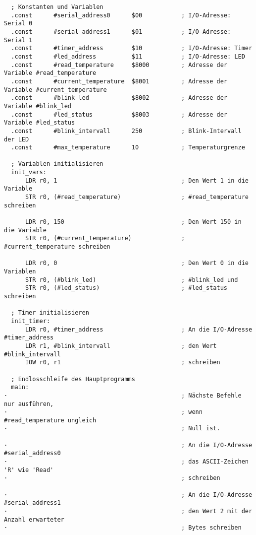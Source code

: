 {
\footnotesize

\begin{verbatim}
  ; Konstanten und Variablen
  .const      #serial_address0      $00           ; I/O-Adresse: Serial 0
  .const      #serial_address1      $01           ; I/O-Adresse: Serial 1
  .const      #timer_address        $10           ; I/O-Adresse: Timer
  .const      #led_address          $11           ; I/O-Adresse: LED
  .const      #read_temperature     $8000         ; Adresse der Variable #read_temperature
  .const      #current_temperature  $8001         ; Adresse der Variable #current_temperature
  .const      #blink_led            $8002         ; Adresse der Variable #blink_led
  .const      #led_status           $8003         ; Adresse der Variable #led_status
  .const      #blink_intervall      250           ; Blink-Intervall der LED
  .const      #max_temperature      10            ; Temperaturgrenze

  ; Variablen initialisieren
  init_vars:
      LDR r0, 1                                   ; Den Wert 1 in die Variable
      STR r0, (#read_temperature)                 ; #read_temperature schreiben

      LDR r0, 150                                 ; Den Wert 150 in die Variable
      STR r0, (#current_temperature)              ; #current_temperature schreiben

      LDR r0, 0                                   ; Den Wert 0 in die Variablen
      STR r0, (#blink_led)                        ; #blink_led und
      STR r0, (#led_status)                       ; #led_status schreiben

  ; Timer initialisieren
  init_timer:
      LDR r0, #timer_address                      ; An die I/O-Adresse #timer_address
      LDR r1, #blink_intervall                    ; den Wert #blink_intervall
      IOW r0, r1                                  ; schreiben

  ; Endlosschleife des Hauptprogramms
  main:
·                                                 ; Nächste Befehle nur ausführen,
·                                                 ; wenn #read_temperature ungleich
·                                                 ; Null ist.

·                                                 ; An die I/O-Adresse #serial_address0
·                                                 ; das ASCII-Zeichen 'R' wie 'Read'
·                                                 ; schreiben

·                                                 ; An die I/O-Adresse #serial_address1
·                                                 ; den Wert 2 mit der Anzahl erwarteter
·                                                 ; Bytes schreiben


\end{verbatim}}

